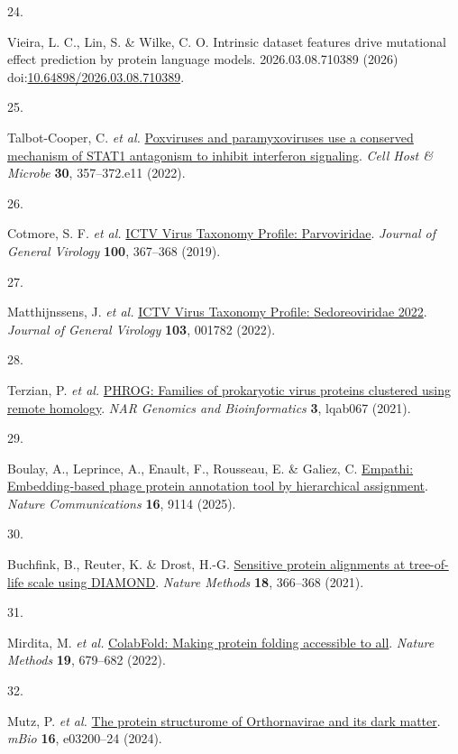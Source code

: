 \documentclass[
  sn-nature,
]{sn-jnl}
\newlength{\cslhangindent}
\newlength{\csllabelwidth}
\newenvironment{CSLReferences}[2] %
 {\begin{list}{}{%
  \setlength{\itemindent}{0pt}
  \setlength{\leftmargin}{0pt}
  \setlength{\parsep}{0pt}
  \ifodd #1
   \setlength{\leftmargin}{\cslhangindent}
   \setlength{\itemindent}{-1\cslhangindent}
  \fi
  \setlength{\itemsep}{#2\baselineskip}}}
 {\end{list}}
\newcommand{\CSLLeftMargin}[1]{\parbox[t]{\csllabelwidth}{\strut#1\strut}}
\newcommand{\CSLRightInline}[1]{\parbox[t]{\linewidth - \csllabelwidth}{\strut#1\strut}}
\begin{document}
\begin{CSLReferences}{0}{0}
\CSLLeftMargin{24. }%
\CSLRightInline{Vieira, L. C., Lin, S. \& Wilke, C. O. Intrinsic dataset
features drive mutational effect prediction by protein language models.
2026.03.08.710389 (2026)
doi:\href{https://doi.org/10.64898/2026.03.08.710389}{10.64898/2026.03.08.710389}.}

\CSLLeftMargin{25. }%
\CSLRightInline{Talbot-Cooper, C. \emph{et al.}
\href{https://doi.org/10.1016/j.chom.2022.01.014}{Poxviruses and
paramyxoviruses use a conserved mechanism of {STAT1} antagonism to
inhibit interferon signaling}. \emph{Cell Host \& Microbe} \textbf{30},
357--372.e11 (2022).}

\CSLLeftMargin{26. }%
\CSLRightInline{Cotmore, S. F. \emph{et al.}
\href{https://doi.org/10.1099/jgv.0.001212}{{ICTV Virus Taxonomy
Profile}: {Parvoviridae}}. \emph{Journal of General Virology}
\textbf{100}, 367--368 (2019).}

\CSLLeftMargin{27. }%
\CSLRightInline{{Matthijnssens, J. \emph{et al.}}
\href{https://doi.org/10.1099/jgv.0.001782}{{ICTV Virus Taxonomy
Profile}: {Sedoreoviridae} 2022}. \emph{Journal of General Virology}
\textbf{103}, 001782 (2022).}

\CSLLeftMargin{28. }%
\CSLRightInline{Terzian, P. \emph{et al.}
\href{https://doi.org/10.1093/nargab/lqab067}{{PHROG}: Families of
prokaryotic virus proteins clustered using remote homology}. \emph{NAR
Genomics and Bioinformatics} \textbf{3}, lqab067 (2021).}

\CSLLeftMargin{29. }%
\CSLRightInline{Boulay, A., Leprince, A., Enault, F., Rousseau, E. \&
Galiez, C. \href{https://doi.org/10.1038/s41467-025-64177-5}{Empathi:
Embedding-based phage protein annotation tool by hierarchical
assignment}. \emph{Nature Communications} \textbf{16}, 9114 (2025).}

\CSLLeftMargin{30. }%
\CSLRightInline{Buchfink, B., Reuter, K. \& Drost, H.-G.
\href{https://doi.org/10.1038/s41592-021-01101-x}{Sensitive protein
alignments at tree-of-life scale using {DIAMOND}}. \emph{Nature Methods}
\textbf{18}, 366--368 (2021).}

\CSLLeftMargin{31. }%
\CSLRightInline{Mirdita, M. \emph{et al.}
\href{https://doi.org/10.1038/s41592-022-01488-1}{{ColabFold}: Making
protein folding accessible to all}. \emph{Nature Methods} \textbf{19},
679--682 (2022).}

\CSLLeftMargin{32. }%
\CSLRightInline{Mutz, P. \emph{et al.}
\href{https://doi.org/10.1128/mbio.03200-24}{The protein structurome of
{Orthornavirae} and its dark matter}. \emph{mBio} \textbf{16},
e03200--24 (2024).}

\end{CSLReferences}
\end{document}
